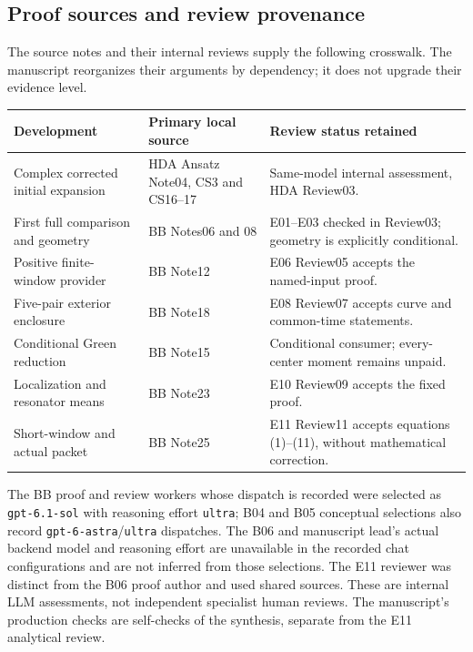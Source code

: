 \subsection{Proof sources and review provenance}

The source notes and their internal reviews supply the following
crosswalk. The manuscript reorganizes their arguments by dependency;
it does not upgrade their evidence level.

\begin{center}\small
\begin{tabularx}{\textwidth}{@{}>{\raggedright\arraybackslash}p{}Y Y@{}}
\toprule
Development & Primary local source & Review status retained\\
\midrule
Complex corrected initial expansion & HDA Ansatz Note04, CS3 and CS16--17 & Same-model internal assessment, HDA Review03.\\
First full comparison and geometry & BB Notes06 and 08 & E01--E03 checked in Review03; geometry is explicitly conditional.\\
Positive finite-window provider & BB Note12 & E06 Review05 accepts the named-input proof.\\
Five-pair exterior enclosure & BB Note18 & E08 Review07 accepts curve and common-time statements.\\
Conditional Green reduction & BB Note15 & Conditional consumer; every-center moment remains unpaid.\\
Localization and resonator means & BB Note23 & E10 Review09 accepts the fixed proof.\\
Short-window and actual packet & BB Note25 & E11 Review11 accepts equations (1)--(11), without mathematical correction.\\
\bottomrule
\end{tabularx}
\end{center}

The BB proof and review workers whose dispatch is recorded were selected
as \texttt{gpt-6.1-sol} with reasoning effort \texttt{ultra}; B04 and
B05 conceptual selections also record \texttt{gpt-6-astra}/\texttt{ultra}
dispatches. The B06 and manuscript lead's actual backend model and
reasoning effort are unavailable in the recorded chat configurations
and are not inferred from those selections. The E11 reviewer was
distinct from the B06 proof author and used shared sources. These are
internal LLM assessments, not independent specialist human reviews.
The manuscript's production checks are self-checks of the synthesis,
separate from the E11 analytical review.

